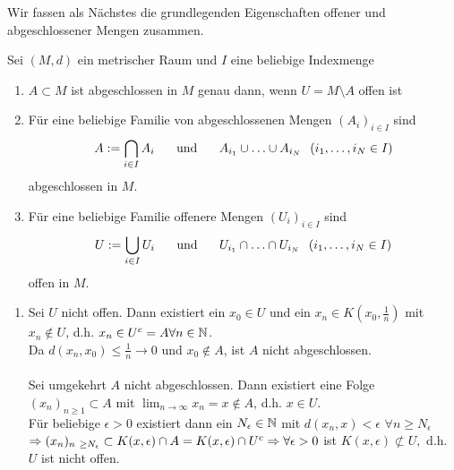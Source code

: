 Wir fassen als Nächstes die grundlegenden Eigenschaften offener und abgeschlossener Mengen zusammen.

\begin{prop}
	Sei $(M, d)$ ein metrischer Raum und $I$ eine beliebige Indexmenge
	\begin{enumerate}[label=\alph*\upshape)]
		\item $A \subset M$ ist abgeschlossen in $M$ genau dann, wenn $U = M \setminus A$ offen ist
		\item Für eine beliebige Familie von abgeschlossenen Mengen $(A_{i})_{i \in I}$ sind 
			\[ A := \bigcap_{i \in I} A_{i} \hspace{0.5cm} \text{ und } \hspace{0.5cm} A_{i_{1}} \cup \dotsc \cup A_{i_{N}} \hspace{0.25cm} (i_{1}, \dotsc, i_{N} \in I) \]
			abgeschlossen in $M$.
		\item Für eine beliebige Familie offenere Mengen $(U_{i})_{i \in I}$ sind
			\[ U := \bigcup_{i \in I} U_{i} \hspace{0.5cm} \text{ und } \hspace{0.5cm} U_{i_{1}} \cap \dotsc \cap U_{i_{N}} \hspace{0.25cm} (i_{1}, \dotsc, i_{N} \in I) \] 
			offen in $M$.
	\end{enumerate}
	\begin{beweis}
		\begin{enumerate}[label=\alph*\upshape)]
			\item Sei $U$ nicht offen. Dann existiert ein $x_{0} \in U$ und  ein $x_{n} \in K(x_{0}, \frac{1}{n})$ mit $x_{n} \notin U$, d.h. $x_{n} \in U^{c} = A \forall n \in \mathbb{N}$. \\
				Da $d(x_{n}, x_{0}) \leq \frac{1}{n} \rightarrow 0$ und $x_{0} \notin A$, ist $A$ nicht abgeschlossen. \\ \\
				Sei umgekehrt $A$ nicht abgeschlossen. Dann existiert eine Folge $(x_{n})_{n \geq 1} \subset A$ mit $\lim_{n \rightarrow \infty} x_{n} = x \notin A$, d.h. $x \in U$. \\
				Für beliebige $\epsilon > 0$ existiert dann ein $N_{\epsilon} \in \mathbb{N}$ mit $d(x_{n}, x) < \epsilon$  $\forall n \geq N_{\epsilon}$ \\	
				$\Rightarrow (x_{n})_{n \geq N_{\epsilon}} \subset K(x, \epsilon) \cap A = K(x, \epsilon) \cap U^{c} \\
				\Rightarrow \forall \epsilon > 0 $ ist $ K(x, \epsilon) \not\subset U, $ d.h. $U$ ist nicht offen.

\end{enumerate}
\end{beweis}
\end{prop}
